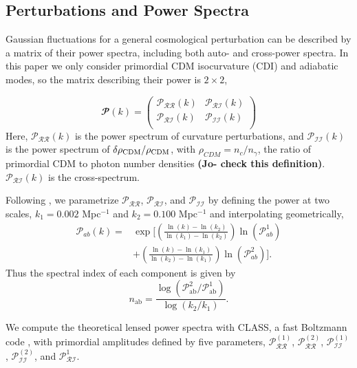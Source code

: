\documentclass{emulateapj}
\newcommand\writingnote[1]{\textcolor{red}{#1}}
\newcommand  \be    {\begin{equation}}
\newcommand  \ee    {\end{equation}}
\newcommand{\prr}{ \mathcal{P}_{\mathcal{R}\mathcal{R}} }
\newcommand{\pri}{ \mathcal{P}_{\mathcal{R}\mathcal{I}} }
\newcommand{\pii}{ \mathcal{P}_{\mathcal{I}\mathcal{I}} }
\begin{document}
\subsection{Perturbations and Power Spectra}\label{powerspectra}


Gaussian fluctuations for a general cosmological perturbation can be described by a matrix of their power spectra, including both auto- and cross-power spectra. In this paper we only consider primordial CDM isocurvature (CDI) and adiabatic modes, so the matrix describing their power is $2 \times 2$,  

\begin{equation}
\mathbfcal{P}(k) = \left( {\begin{array}{cc}
   \prr(k) & \pri(k) \\
   \pri(k) &  \pii(k) \\
  \end{array} } \right)
\end{equation}
Here, $\prr(k)$ is the power spectrum of curvature perturbations, and $\pii(k)$ is the power spectrum of $\delta \rho_{\rm CDM} / \rho_{\rm CDM}$, with $\rho_{CDM} = n_c / n_{\gamma}$, the ratio of primordial CDM to photon number densities {\bf (Jo- check this definition)}. $\pri(k)$ is the cross-spectrum.

Following \cite{planckXX:2015}, we parametrize $\prr$, $\pri$, and $\pii$ by defining the power at two scales, $k_1 = 0.002$ Mpc$^{-1}$ and $k_2 = 0.100$ Mpc$^{-1}$ and interpolating geometrically,
\begin{align*}
\mathcal{P}_{ab}(k) = & \exp \bigg[ \left( \frac{\ln(k) - \ln(k_2)}{\ln(k_1) - \ln(k_2)}\right) \ln \left( \mathcal{P}_{ab}^1 \right) \\
& +
\left( \frac{\ln(k) - \ln(k_1)}{\ln(k_2) - \ln(k_1)}\right) \ln \left( \mathcal{P}_{ab}^2 \right) \bigg].
\end{align*}
Thus the spectral index of each component is given by
\be n_{\text{ab}}  =  \frac{\log( \mathcal{P}_{\text{ab}}^2 / \mathcal{P}_{\text{ab}}^1 )}{\log ( k_2 / k_1 )}. \ee

We compute the theoretical lensed power spectra with CLASS, a fast Boltzmann code \citep{class}, with primordial amplitudes defined by five parameters, $\prr^{(1)}$, $\prr^{(2)}$,  $\pii^{(1)}$, $\pii^{(2)}$, and $\pri^{1}$. 
\end{document}
